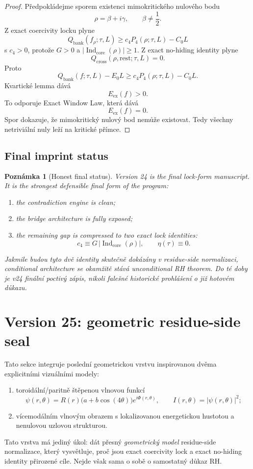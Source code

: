 \documentclass[11pt,a4paper]{article}
\newtheorem{remark}[theorem]{Poznámka}
\begin{document}
\begin{proof}
Předpokládejme sporem existenci mimokritického nulového bodu
\[
\rho=\beta+i\gamma,
\qquad
\beta\neq \frac12.
\]
Z exact coercivity locku plyne
\[
Q_{\mathrm{bank}}(f_\rho;\tau,L)\ge c_4P_4(\rho;\tau,L)-C_0L
\]
s \(c_4>0\), protože \(G>0\) a \(|\operatorname{Ind}_{\mathrm{core}}(\rho)|\ge 1\).
Z exact no-hiding identity plyne
\[
Q_{\mathrm{cross}}(\rho,\mathrm{rest};\tau,L)=0.
\]
Proto
\[
Q_{\mathrm{bank}}(f;\tau,L)-E_0L
\ge
c_4P_4(\rho;\tau,L)-C_0L.
\]
Kvartické lemma dává
\[
E_{\mathrm{ex}}(f)>0.
\]
To odporuje Exact Window Law, která dává
\[
E_{\mathrm{ex}}(f)=0.
\]
Spor dokazuje, že mimokritický nulový bod nemůže existovat. Tedy všechny netriviální nuly
leží na kritické přímce.
\end{proof}

\subsection*{Final imprint status}

\begin{remark}[Honest final status]
Version 24 is the final lock-form manuscript.
It is the strongest defensible final form of the program:
\begin{enumerate}[label=\textbf{(\arabic*)}]
    \item the contradiction engine is clean;
    \item the bridge architecture is fully exposed;
    \item the remaining gap is compressed to two exact lock identities:
    \[
    c_4 \equiv G\,|\operatorname{Ind}_{\mathrm{core}}(\rho)|,
    \qquad
    \eta(\tau)\equiv 0.
    \]
\end{enumerate}
Jakmile budou tyto dvě identity skutečně dokázány v residue-side normalizaci,
conditional architecture se okamžitě stává unconditional RH theorem.
Do té doby je v24 finální poctivý zápis, nikoli falešné historické prohlášení o již hotovém důkazu.
\end{remark}



\section{Version 25: geometric residue-side seal}

Tato sekce integruje poslední geometrickou vrstvu inspirovanou dvěma explicitními
vizuálními modely:
\begin{enumerate}
    \item toroidální/paritně štěpenou vlnovou funkcí
    \[
    \psi(r,\theta)=R(r)\bigl(a+b\cos(4\theta)\bigr)e^{i\Phi(r,\theta)},
    \qquad
    I(r,\theta)=|\psi(r,\theta)|^2;
    \]
    \item vícemodálním vlnovým obrazem s lokalizovanou energetickou hustotou a nenulovou uzlovou strukturou.
\end{enumerate}
Tato vrstva má jediný úkol:
dát přesný \emph{geometrický model} residue-side normalizace, který vysvětluje,
proč jsou exact coercivity lock a exact no-hiding identity přirozené cíle.
Nejde však sama o sobě o samostatný důkaz RH.
\end{document}
